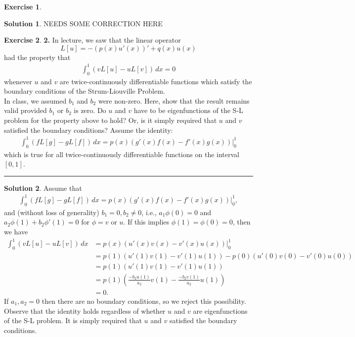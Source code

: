 \documentclass{article}
\theoremstyle{definition}
\newtheorem*{exer*}{Exercise}
\newtheorem*{sln*}{Solution}
\begin{document}
\begin{exer*}
\begin{enumerate}
\begin{sln*}
			NEEDS SOME CORRECTION HERE
			
		\end{sln*}
		
		
		
		\newpage
	\end{enumerate}
	
\end{exer*}

\newpage 

\begin{exer*}\textbf{2. } In lecture, we saw that the linear operator $$L[u] = -(p(x)u'(x))' + q(x)u(x)$$ had the property that
	\begin{align*}
	\int^1_0 (vL[u] - uL[v])\,dx = 0
	\end{align*}
	whenever $u$ and $v$ are twice-continuously differentiable functions which satisfy the boundary conditions of the Strum-Liouville Problem. \\
	
	In class, we assumed $b_1$ and $b_2$ were non-zero. Here, show that the result remains valid
	provided $b_1$ or $b_2$ is zero. Do $u$ and $v$ have to be eigenfunctions of the S-L problem for the property above to hold? Or, is it simply required that $u$ and $v$ satisfied the boundary conditions? Assume the identity:
	\begin{align*}
	\int^1_0 (fL[g] - gL[f])\,dx = p(x)(g'(x)f(x) - f'(x)g(x))\bigg\vert^1_0
	\end{align*}
	which is true for all twice-continuously differentiable functions on the interval $[0,1]$.
	
	\noindent\rule{\textwidth}{0.5pt}
	
	\begin{sln*}
		Assume that
		\begin{align*}
		\int^1_0 (fL[g] - gL[f])\,dx = p(x)(g'(x)f(x) - f'(x)g(x))\bigg\vert^1_0,
		\end{align*}
		and (without loss of generality) $b_1 = 0, b_2\neq 0$, i.e., $a_1\phi(0) = 0$ and $a_2\phi(1) + b_2\phi'(1) =0 $ for $\phi = v$ or $u$. If this implies $\phi(1) = \phi(0) = 0$, then  we have
		\begin{align*}
		\int^1_0 (vL[u] - uL[v])\,dx &= p(x)(u'(x)v(x) - v'(x)u(x))\bigg\vert^1_0\\
		&= p(1)(u'(1)v(1) - v'(1)u(1)) - p(0)(u'(0)v(0) - v'(0)u(0))\\
		&= p(1)(u'(1)v(1) - v'(1)u(1))\\
		&= p(1)\left( \frac{-b_2u(1)}{a_2}v(1) - \frac{-b_2v(1)}{a_2}u(1) \right)\\
		&= 0.
		\end{align*}
		If $a_1, a_2 = 0$ then there are no boundary conditions, so we reject this possibility.\\
		
		Observe that the identity holds regardless of whether $u$ and $v$ are eigenfunctions of the S-L problem. It is simply required that $u$ and $v$ satisfied the boundary conditions. 
	\end{sln*}
\end{exer*}
\end{document}
